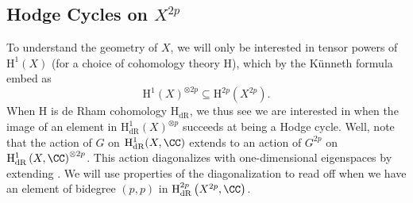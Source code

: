 \documentclass[../thesis.tex]{subfiles}
\begin{document}
\subsection{Hodge Cycles on \texorpdfstring{$X^{2p}$}{ X2p}}
To understand the geometry of $X$, we will only be interested in tensor powers of $\mathrm H^1(X)$ (for a choice of cohomology theory $\mathrm H$), which by the K\"unneth formula embed as
\[\mathrm H^1(X)^{\otimes 2p}\subseteq\mathrm H^{2p}\left(X^{2p}\right).\]
When $\mathrm H$ is de Rham cohomology $\mathrm H_{\mathrm{dR}}$, we thus see we are interested in when the image of an element in $\mathrm H^1_{\mathrm{dR}}(X)^{\otimes p}$ succeeds at being a Hodge cycle. Well, note that the action of $G$ on $\mathrm H^1_{\mathrm{dR}}(X,\CC)$ extends to an action of $G^{2p}$ on $\mathrm H^1_{\mathrm{dR}}\left(X,\CC\right)^{\otimes2p}$. This action diagonalizes with one-dimensional eigenspaces by extending . We will use properties of the diagonalization to read off when we have an element of bidegree $(p,p)$ in $\mathrm H^{2p}_{\mathrm{dR}}\left(X^{2p},\CC\right)$.
\end{document}
